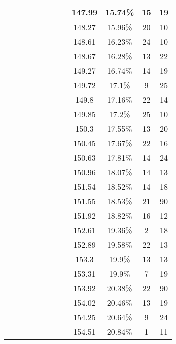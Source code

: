 \begin{center}
\begin{longtable}{|c|c|c|c|c|c|c|c|c|c|c|c|}
 \x &  \x &  &  \x &  \x &  \x &  \x &  \x & 147.99 & 15.74\% & 15 & 19 \\ \hline
 \x &  \x &  \x &  \x &  &  \x &  \x &  & 148.27 & 15.96\% & 20 & 10 \\ \hline
 \x &  &  \x &  \x &  \x &  \x &  &  & 148.61 & 16.23\% & 24 & 10 \\ \hline
 \x &  &  &  \x &  \x &  &  &  \x & 148.67 & 16.28\% & 13 & 22 \\ \hline
 \x &  &  &  \x &  &  &  &  \x & 149.27 & 16.74\% & 14 & 19 \\ \hline
 \x &  &  &  &  &  &  &  & 149.72 & 17.1\% & 9 & 25 \\ \hline
 \x &  &  \x &  &  &  &  \x &  & 149.8 & 17.16\% & 22 & 14 \\ \hline
 \x &  \x &  \x &  \x &  &  \x &  &  & 149.85 & 17.2\% & 25 & 10 \\ \hline
 \x &  &  &  &  &  \x &  \x &  \x & 150.3 & 17.55\% & 13 & 20 \\ \hline
 \x &  \x &  \x &  \x &  &  &  \x &  & 150.45 & 17.67\% & 22 & 16 \\ \hline
 \x &  &  \x &  \x &  \x &  &  &  & 150.63 & 17.81\% & 14 & 24 \\ \hline
 \x &  &  \x &  \x &  &  \x &  &  & 150.96 & 18.07\% & 14 & 13 \\ \hline
 \x &  &  \x &  &  \x &  \x &  &  & 151.54 & 18.52\% & 14 & 18 \\ \hline
 \x &  &  &  &  \x &  \x &  &  \x & 151.55 & 18.53\% & 21 & 90 \\ \hline
 \x &  &  \x &  &  &  \x &  \x &  \x & 151.92 & 18.82\% & 16 & 12 \\ \hline
 \x &  \x &  &  &  \x &  \x &  \x &  & 152.61 & 19.36\% & 2 & 18 \\ \hline
 \x &  \x &  \x &  &  \x &  &  \x &  & 152.89 & 19.58\% & 22 & 13 \\ \hline
 \x &  \x &  &  &  &  &  \x &  & 153.3 & 19.9\% & 13 & 13 \\ \hline
 \x &  \x &  &  &  \x &  &  \x &  & 153.31 & 19.9\% & 7 & 19 \\ \hline
 \x &  &  &  &  &  &  \x &  & 153.92 & 20.38\% & 22 & 90 \\ \hline
 \x &  &  \x &  \x &  &  &  &  & 154.02 & 20.46\% & 13 & 19 \\ \hline
 \x &  \x &  \x &  \x &  \x &  &  &  \x & 154.25 & 20.64\% & 9 & 24 \\ \hline
 \x &  \x &  \x &  &  \x &  &  \x &  \x & 154.51 & 20.84\% & 1 & 11 \\ \hline

\end{longtable}
\end{center}
